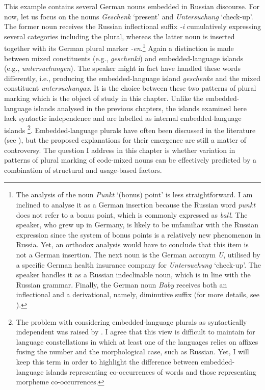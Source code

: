 \begin{sloppypar}
\noindent This example contains several German nouns embedded in Russian discourse. For now, let us focus on the nouns \textit{Geschenk} ‘present’ and \textit{Untersuchung} ‘check-up’. The former noun receives the Russian inflectional suffix \textit{-i} cumulatively expressing several categories including the plural, whereas the latter noun is inserted together with its German plural marker \textit{-en}.\footnote{The analysis of the noun \textit{Punkt} ‘(bonus) point’ is less straightforward. I am inclined to analyse it as a German insertion because the Russian word \textit{punkt} does not refer to a bonus point, which is commonly expressed as \textit{ball}. The speaker, who grew up in Germany, is likely to be unfamiliar with the Russian expression since the system of bonus points is a relatively new phenomenon in Russia. Yet, an orthodox analysis would have to conclude that this item is not a German insertion. The next noun is the German acronym \textit{U}, utilised by a specific German health insurance company for \textit{Untersuchung} ‘check-up’. The speaker handles it as a Russian indeclinable noun, which is in line with the Russian grammar. Finally, the German noun \textit{Baby} receives both an inflectional and a derivational, namely, diminutive suffix (for more details, see ).} Again a distinction is made between mixed constituents (e.g., \textit{geschenki}) and embedded-language islands (e.g., \textit{untersuchungen}). The speaker might in fact have handled these words differently, i.e., producing the embedded-language island \textit{geschenke} and the mixed constituent \textit{untersuchungax}. It is the choice between these two patterns of plural marking which is the object of study in this chapter. Unlike the embedded-language islands analysed in the previous chapters, the islands examined here lack syntactic independence and are labelled as internal embedded-language islands \citep[][149--150]{myers-scotton-contact-2002}\footnote{The problem with considering embedded-language plurals as syntactically independent was raised by \citet[][36--37]{boumans-syntax-1998}. I agree that this view is difficult to maintain for language constellations in which at least one of the languages relies on affixes fusing the number and the morphological case, such as Russian. Yet, I will keep this term in order to highlight the difference between embedded-language islands representing co-occurrences of words and those representing morpheme co-occurrences.}. Embedded-language plurals have often been discussed in the literature (see \citealt{backus-two-1996, backus-evidence-1999, backus-units-2003, boumans-syntax-1998, muhamedowa-untersuchung-2006,myers-scotton-duelling-1993, myers-scotton-contact-2002}), but the proposed explanations for their emergence are still a matter of controversy. The question I address in this chapter is whether variation in patterns of plural marking of code-mixed nouns can be effectively predicted by a combination of structural and usage-based factors.
\end{sloppypar}

